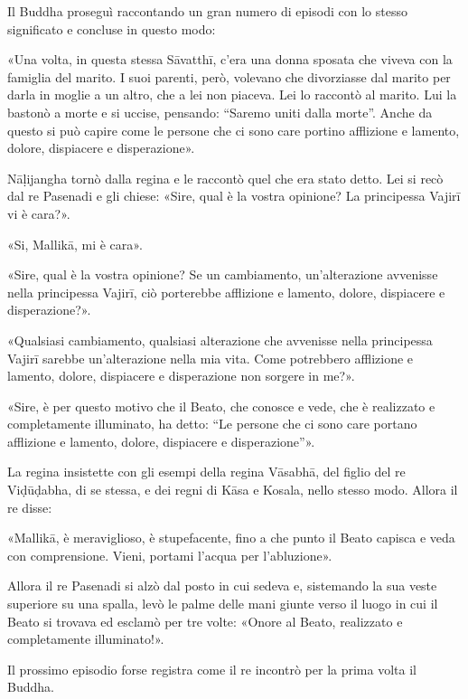  Il Buddha proseguì raccontando un gran numero di
episodi con lo stesso significato e concluse in questo modo:


 «Una volta, in questa stessa Sāvatthī, c’era una donna
sposata che viveva con la famiglia del marito. I suoi parenti, però,
volevano che divorziasse dal marito per darla in moglie a un altro, che
a lei non piaceva. Lei lo raccontò al marito. Lui la bastonò a morte e
si uccise, pensando: “Saremo uniti dalla morte”. Anche da questo si può
capire come le persone che ci sono care portino afflizione e lamento,
dolore, dispiacere e disperazione».


Nāḷijangha tornò dalla regina e le raccontò quel che era stato detto.
Lei si recò dal re Pasenadi e gli chiese: «Sire, qual è la vostra
opinione? La principessa Vajirī vi è cara?».


«Si, Mallikā, mi è cara».


«Sire, qual è la vostra opinione? Se un cambiamento, un’alterazione
avvenisse nella principessa Vajirī, ciò porterebbe afflizione e lamento,
dolore, dispiacere e disperazione?».


«Qualsiasi cambiamento, qualsiasi alterazione che avvenisse nella
principessa Vajirī sarebbe un’alterazione nella mia vita. Come
potrebbero afflizione e lamento, dolore, dispiacere e disperazione non
sorgere in me?».


«Sire, è per questo motivo che il Beato, che conosce e vede, che è
realizzato e completamente illuminato, ha detto: “Le persone che ci sono
care portano afflizione e lamento, dolore, dispiacere e disperazione”».


 La regina insistette con gli esempi della regina
Vāsabhā, del figlio del re Viḍūḍabha, di se stessa, e dei regni di Kāsa
e Kosala, nello stesso modo. Allora il re disse:


 «Mallikā, è meraviglioso, è stupefacente, fino a che punto
il Beato capisca e veda con comprensione. Vieni, portami l’acqua per
l’abluzione».


Allora il re Pasenadi si alzò dal posto in cui sedeva e, sistemando la
sua veste superiore su una spalla, levò le palme delle mani giunte verso
il luogo in cui il Beato si trovava ed esclamò per tre volte: «Onore al
Beato, realizzato e completamente illuminato!».




 Il prossimo episodio forse registra come il re
incontrò per la prima volta il Buddha.



